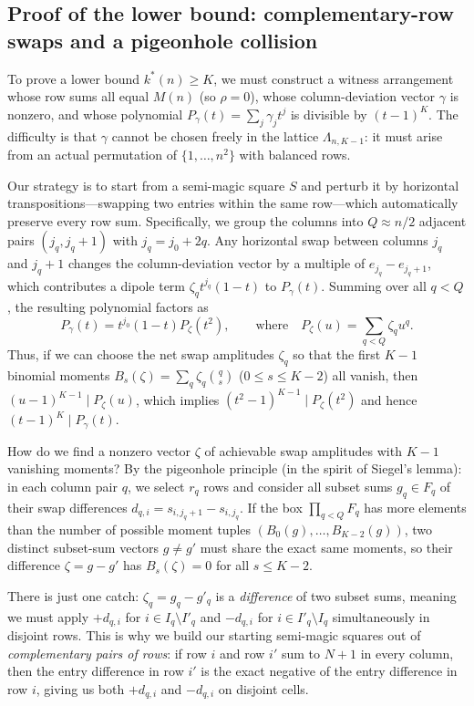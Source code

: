 \subsection{Proof of the lower bound: complementary-row swaps and a pigeonhole collision}
\label{sec:kstar_lower}

To prove a lower bound $k^*(n)\ge K$, we must construct a witness arrangement whose row sums all equal $M(n)$ (so $\rho=0$), whose column-deviation vector $\gamma$ is nonzero, and whose polynomial $P_\gamma(t)=\sum_j\gamma_jt^j$ is divisible by $(t-1)^K$. The difficulty is that $\gamma$ cannot be chosen freely in the lattice $\Lambda_{n,K-1}$: it must arise from an actual permutation of $\{1,\dots,n^2\}$ with balanced rows.

Our strategy is to start from a semi-magic square $S$ and perturb it by horizontal transpositions—swapping two entries within the same row—which automatically preserve every row sum. Specifically, we group the columns into $Q\approx n/2$ adjacent pairs $(j_q, j_q+1)$ with $j_q=j_0+2q$. Any horizontal swap between columns $j_q$ and $j_q+1$ changes the column-deviation vector by a multiple of $e_{j_q}-e_{j_q+1}$, which contributes a dipole term $\zeta_q t^{j_q}(1-t)$ to $P_\gamma(t)$. Summing over all $q<Q$, the resulting polynomial factors as
\[
P_\gamma(t)=t^{j_0}(1-t)P_\zeta(t^2),\qquad\text{where}\quad P_\zeta(u)=\sum_{q<Q}\zeta_q u^q.
\]
Thus, if we can choose the net swap amplitudes $\zeta_q$ so that the first $K-1$ binomial moments $B_s(\zeta)=\sum_q\zeta_q\binom qs$ ($0\le s\le K-2$) all vanish, then $(u-1)^{K-1}\mid P_\zeta(u)$, which implies $(t^2-1)^{K-1}\mid P_\zeta(t^2)$ and hence $(t-1)^K\mid P_\gamma(t)$.

How do we find a nonzero vector $\zeta$ of achievable swap amplitudes with $K-1$ vanishing moments? By the pigeonhole principle (in the spirit of Siegel's lemma): in each column pair $q$, we select $r_q$ rows and consider all subset sums $g_q \in F_q$ of their swap differences $d_{q,i}=s_{i,j_q+1}-s_{i,j_q}$. If the box $\prod_{q<Q} F_q$ has more elements than the number of possible moment tuples $(B_0(g),\dots,B_{K-2}(g))$, two distinct subset-sum vectors $g\ne g'$ must share the exact same moments, so their difference $\zeta = g - g'$ has $B_s(\zeta)=0$ for all $s\le K-2$.

There is just one catch: $\zeta_q = g_q - g'_q$ is a \emph{difference} of two subset sums, meaning we must apply $+d_{q,i}$ for $i\in I_q\setminus I'_q$ and $-d_{q,i}$ for $i\in I'_q\setminus I_q$ simultaneously in disjoint rows. This is why we build our starting semi-magic squares out of \emph{complementary pairs of rows}: if row $i$ and row $i'$ sum to $N+1$ in every column, then the entry difference in row $i'$ is the exact negative of the entry difference in row $i$, giving us both $+d_{q,i}$ and $-d_{q,i}$ on disjoint cells.

